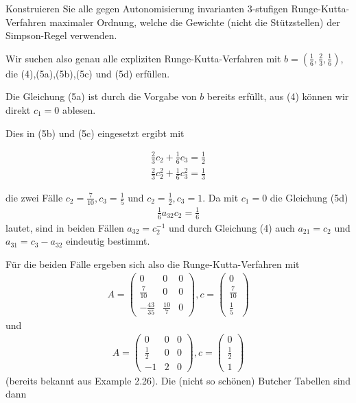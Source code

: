 \begin{exercise}

Konstruieren Sie alle gegen Autonomisierung invarianten $3$-stufigen Runge-Kutta-Verfahren maximaler Ordnung, welche die Gewichte (nicht die Stützstellen) der Simpson-Regel verwenden.

\end{exercise}

\begin{solution}

Wir suchen also genau alle expliziten Runge-Kutta-Verfahren mit $b = (\frac{1}{6},\frac{2}{3},\frac{1}{6})$, die (4),(5a),(5b),(5c) und (5d) erfüllen.

Die Gleichung (5a) ist durch die Vorgabe von $b$ bereits erfüllt, aus (4) können wir direkt $c_{1}=0$ ablesen.

Dies in (5b) und (5c) eingesetzt ergibt mit

\begin{align*}
    \frac{2}{3}c_{2} + \frac{1}{6}c_{3} = \frac{1}{2} \\
    \frac{2}{3}c_{2}^{2} + \frac{1}{6}c_{3}^{2} = \frac{1}{3}
\end{align*}

die zwei Fälle $c_{2}=\frac{7}{10}, c_{3}=\frac{1}{5}$ und $c_{2}=\frac{1}{2}, c_{3}=1$.
Da mit $c_{1}=0$ die Gleichung (5d)
\begin{align*}
    \frac{1}{6}a_{32}c_{2}=\frac{1}{6}
\end{align*}
lautet, sind in beiden Fällen $a_{32}=c_{2}^{-1}$ und durch Gleichung (4) auch $a_{21}=c_{2}$ und $a_{31}=c_{3}-a_{32}$ eindeutig bestimmt.

Für die beiden Fälle ergeben sich also die Runge-Kutta-Verfahren mit
\begin{align*}
    A = \left( \begin{array}{rrr}
         0 & 0 & 0 \\
        \frac{7}{10} & 0 & 0 \\
        -\frac{43}{35} & \frac{10}{7} & 0
    \end{array} \right) , c = \begin{pmatrix}
    0 \\ \frac{7}{10} \\ \frac{1}{5}
    \end{pmatrix}
\end{align*}
und
\begin{align*}
    A = \left( \begin{array}{rrr}
         0 & 0 & 0 \\
        \frac{1}{2} & 0 & 0 \\
        -1 & 2 & 0
    \end{array} \right) , c = \begin{pmatrix}
    0 \\ \frac{1}{2} \\ 1
    \end{pmatrix}
\end{align*}
(bereits bekannt aus Example 2.26). Die (nicht so schönen) Butcher Tabellen sind dann


\end{solution}
